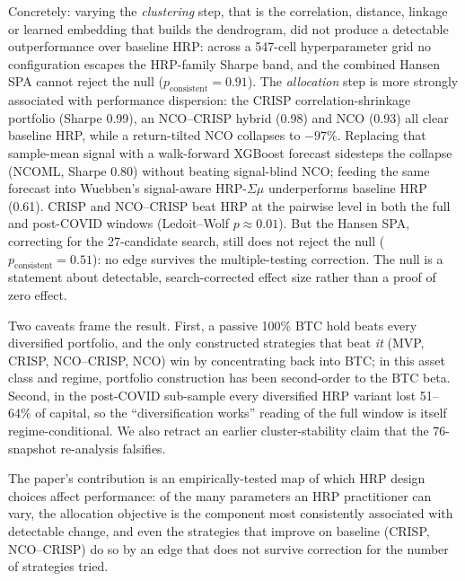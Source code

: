 \documentclass[11pt,a4paper]{article}
\begin{document}
Concretely: varying the \emph{clustering} step, that is the
correlation, distance, linkage or learned embedding that builds the
dendrogram, did not produce a detectable outperformance over baseline
HRP: across a 547-cell hyperparameter grid no configuration escapes
the HRP-family Sharpe band, and the combined Hansen SPA cannot reject
the null ($p_{\text{consistent}}=0.91$). The \emph{allocation} step
is more strongly associated with performance dispersion:
the CRISP correlation-shrinkage portfolio (Sharpe 0.99), an NCO--CRISP
hybrid (0.98) and NCO (0.93) all clear baseline HRP, while a
return-tilted NCO collapses to $-97\%$. Replacing that sample-mean
signal with a walk-forward XGBoost forecast sidesteps the collapse
(NCOML, Sharpe 0.80) without beating signal-blind NCO; feeding the
same forecast into Wuebben's signal-aware HRP-$\Sigma\mu$ underperforms
baseline HRP (0.61). CRISP and NCO--CRISP beat HRP at the pairwise
level in both the full and post-COVID windows (Ledoit--Wolf
$p\approx0.01$). But the Hansen SPA, correcting for the 27-candidate
search, still does not reject the null
($p_{\text{consistent}}=0.51$): no edge survives the multiple-testing
correction. The null is a statement about detectable, search-corrected
effect size rather than a proof of zero effect.

Two caveats frame the result. First, a passive 100\% BTC hold beats
every diversified portfolio, and the only constructed strategies that
beat \emph{it} (MVP, CRISP, NCO--CRISP, NCO) win by concentrating back
into BTC; in this asset class and regime, portfolio construction has
been second-order to the BTC beta. Second, in the post-COVID sub-sample
every diversified HRP variant lost 51--64\% of capital, so the
``diversification works'' reading of the full window is itself
regime-conditional. We also retract an earlier cluster-stability claim
that the 76-snapshot re-analysis falsifies.

The paper's contribution is an empirically-tested map of which HRP
design choices affect performance: of the many parameters an HRP
practitioner can vary, the allocation objective is the component most
consistently associated with
detectable change, and even the strategies that improve on baseline
(CRISP, NCO--CRISP) do so by an edge that does not survive correction
for the number of strategies tried.
\end{document}
